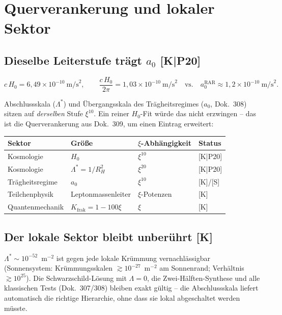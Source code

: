 \chapter{Querverankerung und lokaler Sektor}

\section{Dieselbe Leiterstufe trägt $a_0$ [K|P20]}

\[
  c\,H_0 = 6{,}49\times10^{-10}~\text{m/s}^2,
  \qquad
  \frac{c\,H_0}{2\pi} = 1{,}03\times10^{-10}~\text{m/s}^2
  \quad\text{vs.}\quad
  a_0^\text{RAR} \approx 1{,}2\times10^{-10}~\text{m/s}^2.
\]

Abschlussskala ($\Lambda^{*}$) und Übergangsskala des
Trägheitsregimes ($a_0$, Dok.~308) sitzen auf \emph{derselben} Stufe
$\xi^{10}$. Ein reiner $H_0$-Fit würde das nicht erzwingen -- das ist
die Querverankerung aus Dok.~309, um einen Eintrag erweitert:

\begin{center}
\begin{tabular}{llll}
\toprule
Sektor & Größe & $\xi$-Abhängigkeit & Status \\
\midrule
Kosmologie & $H_0$ & $\xi^{10}$ & [K|P20] \\
Kosmologie & $\Lambda^{*} = 1/R_H^2$ & $\xi^{20}$ & [K|P20] \\
Trägheitsregime & $a_0$ & $\xi^{10}$ & [K]/[S] \\
Teilchenphysik & Leptonmassenleiter & $\xi$-Potenzen & [K] \\
Quantenmechanik & $K_\text{frak} = 1-100\xi$ & $\xi$ & [K] \\
\bottomrule
\end{tabular}
\end{center}

\section{Der lokale Sektor bleibt unberührt [K]}

$\Lambda^{*} \sim 10^{-52}$~m$^{-2}$ ist gegen jede lokale Krümmung
vernachlässigbar (Sonnensystem: Krümmungsskalen
$\gtrsim 10^{-27}$~m$^{-2}$ am Sonnenrand; Verhältnis
$\gtrsim 10^{25}$). Die Schwarzschild-Lösung mit $\Lambda = 0$, die
Zwei-Hälften-Synthese und alle klassischen Tests (Dok.~307/308)
bleiben exakt gültig -- die Abschlussskala liefert automatisch die
richtige Hierarchie, ohne dass sie lokal abgeschaltet werden müsste.

